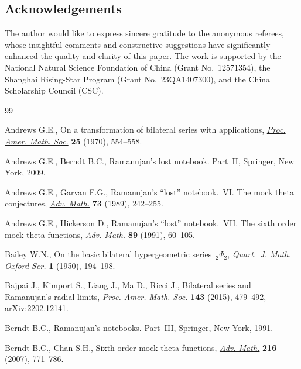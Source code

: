 \documentclass[pdftex]{sigma}
\numberwithin{equation}{section}
\begin{document}
\subsection*{Acknowledgements}
The author would like to express sincere gratitude to the anonymous referees, whose insightful comments and constructive suggestions have significantly enhanced the quality and clarity of this paper.
The work is supported by the National Natural Science Foundation of China (Grant No.~12571354), the Shanghai Rising-Star Program (Grant No.~23QA1407300), and the China Scholarship Council (CSC).

\begin{thebibliography}{99}
\footnotesize\itemsep=0pt

Andrews G.E., On a transformation of bilateral series with applications,
  \href{https://doi.org/10.2307/2036642}{\textit{Proc. Amer. Math. Soc.}}
  \textbf{25} (1970), 554--558.

Andrews G.E., Berndt B.C., Ramanujan's lost notebook. {P}art~{II},
  \href{https://doi.org/10.1007/b13290}{Springer}, New York, 2009.

Andrews G.E., Garvan F.G., Ramanujan's ``lost'' notebook.~{VI}. {T}he mock
  theta conjectures,
  \href{https://doi.org/10.1016/0001-8708(89)90070-4}{\textit{Adv. Math.}}
  \textbf{73} (1989), 242--255.

Andrews G.E., Hickerson D., Ramanujan's ``lost'' notebook.~{VII}. {T}he sixth
  order mock theta functions,
  \href{https://doi.org/10.1016/0001-8708(91)90083-J}{\textit{Adv. Math.}}
  \textbf{89} (1991), 60--105.

Bailey W.N., On the basic bilateral hypergeometric series~{${}_2\Psi_2$},
  \href{https://doi.org/10.1093/qmath/1.1.194}{\textit{Quart.~J. Math. Oxford
  Ser.}} \textbf{1} (1950), 194--198.

Bajpai J., Kimport S., Liang J., Ma D., Ricci J., Bilateral series and
  {R}amanujan's radial limits,
  \href{https://doi.org/10.1090/S0002-9939-2014-12249-0}{\textit{Proc. Amer.
  Math. Soc.}} \textbf{143} (2015), 479--492,
  \href{http://arxiv.org/abs/2202.12141}{arXiv:2202.12141}.

Berndt B.C., Ramanujan's notebooks. {P}art~{III},
  \href{https://doi.org/10.1007/978-1-4612-0965-2}{Springer}, New York, 1991.

Berndt B.C., Chan S.H., Sixth order mock theta functions,
  \href{https://doi.org/10.1016/j.aim.2007.06.004}{\textit{Adv. Math.}}
  \textbf{216} (2007), 771--786.


\end{thebibliography}
\end{document}
